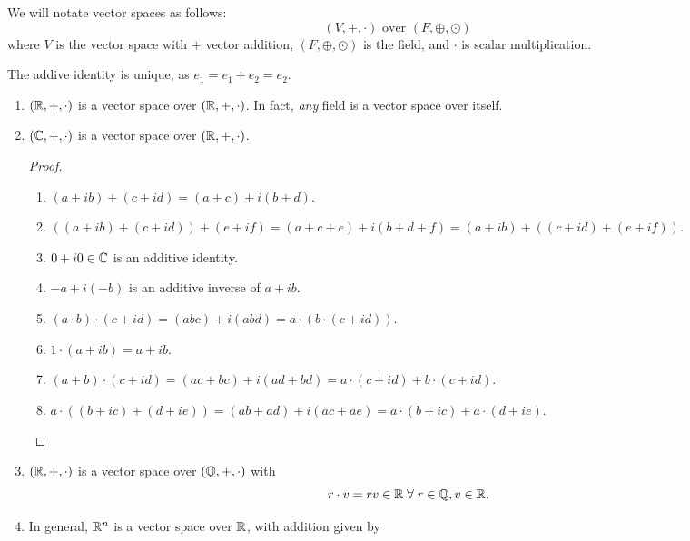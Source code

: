 
\begin{rem}
    We will notate vector spaces as follows: \[
        (V, +, \cdot) \text{ over } (F, \oplus, \odot)
    \] where $V$ is the vector space with $+$ vector addition, $(F, \oplus, \odot)$ is the field, and $\cdot$ is scalar multiplication.
\end{rem}

The addive identity is unique, as $e_{1} = e_{1} + e_{2} = e_{2}$.

\begin{example}
    \begin{enumerate}[label=(\alph*)]
        \item $(\mathbb{R}, +, \cdot)$ is a vector space over $(\mathbb{R}, +, \cdot)$. In fact, \emph{any} field is a vector space over itself.
        \item $(\mathbb{C}, +, \cdot)$ is a vector space over $(\mathbb{R}, +, \cdot)$. 
        \begin{proof} \leavevmode
            \begin{enumerate}[label=(V\arabic*)]
                \item $(a + ib) + (c + id) = (a + c) + i (b + d)$.
                \item $((a + ib) + (c + id)) + (e + if) = (a + c + e) + i (b + d + f) = (a + ib) + ((c + id) + (e + if))$.
                \item $0 + i 0 \in \mathbb{C}$ is an additive identity.
                \item $-a + i(-b)$ is an additive inverse of $a + ib$.
                \item $(a \cdot b) \cdot (c + id) = (abc) + i(abd) = a \cdot (b \cdot (c + id))$.
                \item $1 \cdot (a + ib) = a + ib$.
                \item $(a + b) \cdot (c + id) = (ac + bc) + i(ad + bd) = a \cdot (c + id) + b \cdot (c + id)$.
                \item $a \cdot ((b + ic) + (d + ie)) = (ab + ad) + i(ac + ae) = a \cdot (b + ic) + a \cdot (d + ie)$. \qedhere
            \end{enumerate}
        \end{proof}
        \item $(\mathbb{R}, +, \cdot)$ is a vector space over $(\mathbb{Q}, +, \cdot)$ with \[
            r \cdot v = rv \in \mathbb{R} \;\forall\; r \in \mathbb{Q}, v \in \mathbb{R}.
        \]
        \item In general, $\mathbb{R}^{n}$ is a vector space over $\mathbb{R}$, with addition given by \[
\]
\end{enumerate}
\end{example}
